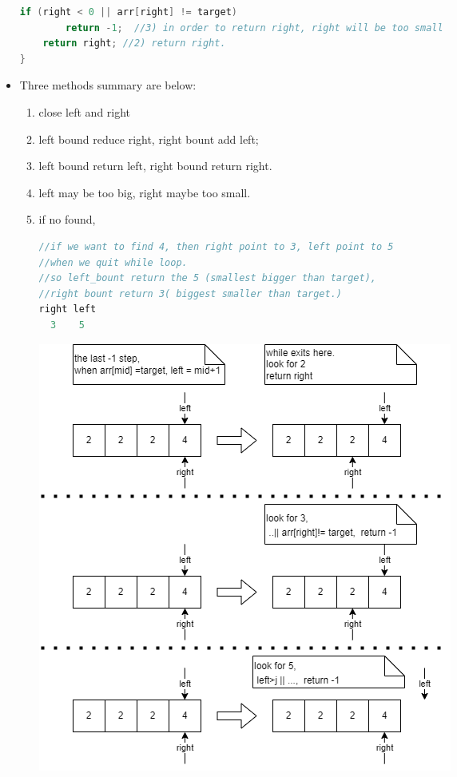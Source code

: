 \documentclass[a4paper,11pt,twoside]{book}
\begin{document}
\begin{itemize}
\begin{lstlisting}[frame=single, language=c++]
	if (right < 0 || arr[right] != target)
		return -1;  //3) in order to return right, right will be too small
	return right; //2) return right.   
}	
\end{lstlisting}
	
\item Three methods summary are below:
\begin{enumerate}
	\item close left and right
	\item left bound reduce right, right bount add left;
	\item left bound return left, right bound return right.
	\item left may be too big, right maybe too small. 
	\item if no found, 
\begin{lstlisting}[frame=single, language=c++]
//if we want to find 4, then right point to 3, left point to 5
//when we quit while loop. 
//so left_bount return the 5 (smallest bigger than target),  
//right bount return 3( biggest smaller than target.)
right left
  3    5
\end{lstlisting}	


\begin{center}
		\includegraphics[width=0.7\linewidth]{pics/binary_search.drawio.png}
\end{center}

\end{enumerate}

\end{itemize}
\end{document}
